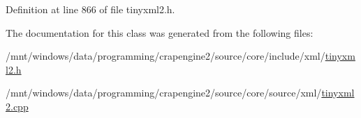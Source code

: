 Definition at line 866 of file tinyxml2.\+h.



The documentation for this class was generated from the following files\+:\begin{DoxyCompactItemize}
\item 
/mnt/windows/data/programming/crapengine2/source/core/include/xml/\hyperlink{tinyxml2_8h}{tinyxml2.\+h}\item 
/mnt/windows/data/programming/crapengine2/source/core/source/xml/\hyperlink{tinyxml2_8cpp}{tinyxml2.\+cpp}\end{DoxyCompactItemize}
